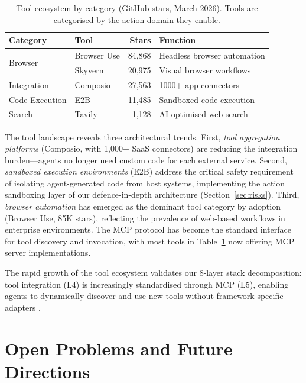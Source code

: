 \documentclass[review,authoryear]{elsarticle}
\theoremstyle{definition}
\begin{document}
\begin{table}[ht]
\centering
\caption{Tool ecosystem by category (GitHub stars, March 2026). Tools are categorised by the action domain they enable.}
\label{tab:tools}
\begin{tabular}{llrl}
\toprule
\textbf{Category} & \textbf{Tool} & \textbf{Stars} & \textbf{Function} \\
\midrule
\multirow{2}{*}{Browser}     & Browser Use & 84,868 & Headless browser automation \\
                              & Skyvern     & 20,975 & Visual browser workflows \\
Integration                   & Composio    & 27,563 & 1000+ app connectors \\
Code Execution                & E2B         & 11,485 & Sandboxed code execution \\
Search                        & Tavily      & 1,128  & AI-optimised web search \\
\bottomrule
\end{tabular}
\end{table}

The tool landscape reveals three architectural trends. First, \emph{tool aggregation platforms} (Composio, with 1,000+ SaaS connectors) are reducing the integration burden---agents no longer need custom code for each external service. Second, \emph{sandboxed execution environments} (E2B) address the critical safety requirement of isolating agent-generated code from host systems, implementing the action sandboxing layer of our defence-in-depth architecture (Section~\ref{sec:risks}). Third, \emph{browser automation} has emerged as the dominant tool category by adoption (Browser Use, 85K stars), reflecting the prevalence of web-based workflows in enterprise environments. The MCP protocol \citep{anthropic2024mcp} has become the standard interface for tool discovery and invocation, with most tools in Table~\ref{tab:tools} now offering MCP server implementations.

The rapid growth of the tool ecosystem validates our 8-layer stack decomposition: tool integration (L4) is increasingly standardised through MCP (L5), enabling agents to dynamically discover and use new tools without framework-specific adapters \citep{qin2024toollearning}.

\section{Open Problems and Future Directions}\label{sec:future}
\end{document}
